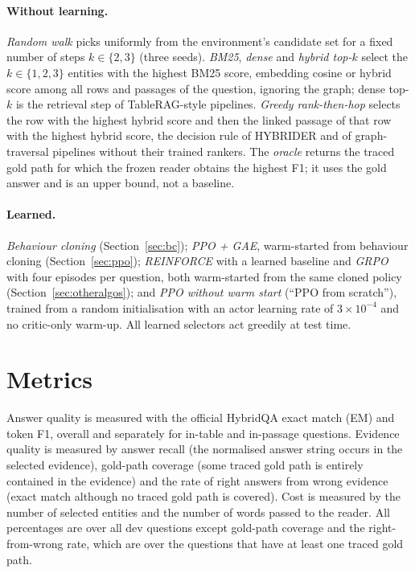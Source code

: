 \paragraph{Without learning.} \emph{Random walk} picks uniformly from the environment's candidate set for a fixed number of steps $k\in\{2,3\}$ (three seeds). \emph{BM25}, \emph{dense} and \emph{hybrid top-$k$} select the $k\in\{1,2,3\}$ entities with the highest BM25 score, embedding cosine or hybrid score among all rows and passages of the question, ignoring the graph; dense top-$k$ is the retrieval step of TableRAG-style pipelines. \emph{Greedy rank-then-hop} selects the row with the highest hybrid score and then the linked passage of that row with the highest hybrid score, the decision rule of HYBRIDER and of graph-traversal pipelines without their trained rankers. The \emph{oracle} returns the traced gold path for which the frozen reader obtains the highest F1; it uses the gold answer and is an upper bound, not a baseline.

\paragraph{Learned.} \emph{Behaviour cloning} (Section~\ref{sec:bc}); \emph{PPO + GAE}, warm-started from behaviour cloning (Section~\ref{sec:ppo}); \emph{REINFORCE} with a learned baseline and \emph{GRPO} with four episodes per question, both warm-started from the same cloned policy (Section~\ref{sec:otheralgos}); and \emph{PPO without warm start} (``PPO from scratch''), trained from a random initialisation with an actor learning rate of $3\times10^{-4}$ and no critic-only warm-up. All learned selectors act greedily at test time.

\section{Metrics}

Answer quality is measured with the official HybridQA exact match (EM) and token F1, overall and separately for in-table and in-passage questions. Evidence quality is measured by answer recall (the normalised answer string occurs in the selected evidence), gold-path coverage (some traced gold path is entirely contained in the evidence) and the rate of right answers from wrong evidence (exact match although no traced gold path is covered). Cost is measured by the number of selected entities and the number of words passed to the reader. All percentages are over all dev questions except gold-path coverage and the right-from-wrong rate, which are over the questions that have at least one traced gold path.

